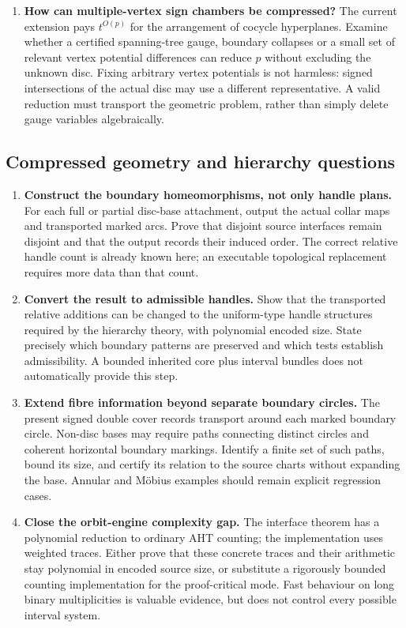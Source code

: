 \begin{enumerate}[label=A\arabic*.]
\item \textbf{How can multiple-vertex sign chambers be compressed?}
The current extension pays $t^{O(p)}$ for the arrangement of cocycle
hyperplanes. Examine whether a certified spanning-tree gauge, boundary
collapses or a small set of relevant vertex potential differences can
reduce $p$ without excluding the unknown disc. Fixing arbitrary vertex
potentials is not harmless: signed intersections of the actual disc may
use a different representative. A valid reduction must transport the
geometric problem, rather than simply delete gauge variables algebraically.
\end{enumerate}

\subsection{Compressed geometry and hierarchy questions}

\begin{enumerate}[label=H\arabic*.]
\item \textbf{Construct the boundary homeomorphisms, not only handle plans.}
For each full or partial disc-base attachment, output the actual collar
maps and transported marked arcs. Prove that disjoint source interfaces
remain disjoint and that the output records their induced order. The
correct relative handle count is already known here; an executable
topological replacement requires more data than that count.

\item \textbf{Convert the result to admissible handles.}
Show that the transported relative additions can be changed to the
uniform-type handle structures required by the hierarchy theory, with
polynomial encoded size. State precisely which boundary patterns are
preserved and which tests establish admissibility. A bounded inherited
core plus interval bundles does not automatically provide this step.

\item \textbf{Extend fibre information beyond separate boundary circles.}
The present signed double cover records transport around each marked
boundary circle. Non-disc bases may require paths connecting distinct
circles and coherent horizontal boundary markings. Identify a finite
set of such paths, bound its size, and certify its relation to the source
charts without expanding the base. Annular and M\"obius examples should
remain explicit regression cases.

\item \textbf{Close the orbit-engine complexity gap.}
The interface theorem has a polynomial reduction to ordinary AHT
counting; the implementation uses weighted traces. Either prove that
these concrete traces and their arithmetic stay polynomial in encoded
source size, or substitute a rigorously bounded counting implementation
for the proof-critical mode. Fast behaviour on long binary multiplicities
is valuable evidence, but does not control every possible interval system.
\end{enumerate}

